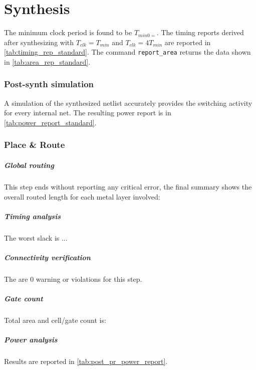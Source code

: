 \chapter{Synthesis}
The minimum clock period is found to be $T_{min0=}$. The timing reports derived after synthesizing with $T_{clk}=T_{min}$ and $T_{clk}=4T_{min}$ are reported in \autoref{tab:timing_rep_standard}.
The command \texttt{report\_area} returns the data shown in \autoref{tab:area_rep_standard}.
\subsection{Post-synth simulation}
A simulation of the synthesized netlist accurately provides the switching activity for every internal net. The resulting power report is in \autoref{tab:power_report_standard}.

\subsection{Place \& Route}
\paragraph{Global routing} This step ends without reporting any critical error, the final summary shows the overall routed length for each metal layer involved:


\paragraph{Timing analysis} The worst slack is ...


\paragraph{Connectivity verification} The are 0 warning or violations for this step.


\paragraph{Gate count} Total area and cell/gate count is:


\paragraph{Power analysis} Results are reported in \autoref{tab:post_pr_power_report}.